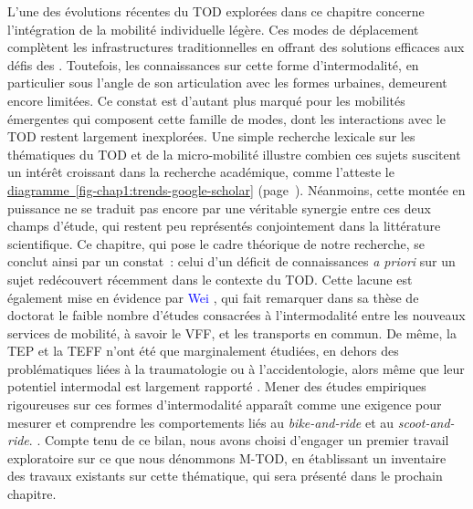 \begin{refsegment}
L’une des évolutions récentes du \acrshort{TOD} explorées dans ce chapitre concerne l’intégration de la mobilité individuelle légère. Ces modes de déplacement complètent les infrastructures traditionnelles en offrant des solutions efficaces aux défis des . Toutefois, les connaissances sur cette forme d’intermodalité, en particulier sous l’angle de son articulation avec les formes urbaines, demeurent encore limitées. Ce constat est d’autant plus marqué pour les mobilités émergentes qui composent cette famille de modes, dont les interactions avec le \acrshort{TOD} restent largement inexplorées. Une simple recherche lexicale sur les thématiques du \acrshort{TOD} et de la micro-mobilité illustre combien ces sujets suscitent un intérêt croissant dans la recherche académique, comme l'atteste le \hyperref[fig-chap1:trends-google-scholar]{diagramme~\ref{fig-chap1:trends-google-scholar}} (page~\pageref{fig-chap1:trends-google-scholar}). Néanmoins, cette montée en puissance ne se traduit pas encore par une véritable synergie entre ces deux champs d’étude, qui restent peu représentés conjointement dans la littérature scientifique. Ce chapitre, qui pose le cadre théorique de notre recherche, se conclut ainsi par un constat~: celui d’un déficit de connaissances \textsl{a priori} sur un sujet redécouvert récemment dans le contexte du \acrshort{TOD}. Cette lacune est également mise en évidence par \textcolor{blue}{Wei} \textcolor{blue}{\textcite[90]{kang_university_2020}}, qui fait remarquer dans sa thèse de doctorat le faible nombre d’études consacrées à l’intermodalité entre les nouveaux services de mobilité, à savoir le \acrshort{VFF}, et les transports en commun. De même, la \acrshort{TEP} et la \acrshort{TEFF} n’ont été que marginalement étudiées, en dehors des problématiques liées à la traumatologie ou à l’accidentologie, alors même que leur potentiel intermodal est largement rapporté \textcolor{blue}{\autocite{richer_dossier_2021}}. Mener des études empiriques rigoureuses sur ces formes d’intermodalité apparaît comme une exigence pour mesurer et comprendre les comportements liés au \textsl{bike-and-ride} et au \textsl{scoot-and-ride}. \textcolor{blue}{\autocite[13]{bortoli_consequential_2020}}. Compte tenu de ce bilan, nous avons choisi d’engager un premier travail exploratoire sur ce que nous dénommons \acrshort{M-TOD}, en établissant un inventaire des travaux existants sur cette thématique, qui sera présenté dans le prochain chapitre.%


\end{refsegment}
